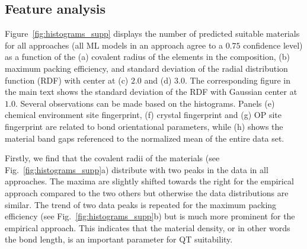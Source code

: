 \documentclass[superscriptaddress,unsortedaddress,
 amsmath,amssymb,
 aps,
]{revtex4-2}
\begin{document}
\subsection*{Feature analysis}
Figure~\ref{fig:histograms_supp} displays the number of predicted suitable materials for all approaches (all ML models in an approach agree to a $0.75$ confidence level) as a function of the (a) covalent radius of the elements in the composition, (b) maximum packing efficiency, and standard deviation of the radial distribution function (RDF) with center at (c) $2.0$ and (d) $3.0$. The corresponding figure in the main text shows the standard deviation of the RDF with Gaussian center at $1.0$. Several observations can be made based on the histograms. Panels (e) chemical environment site fingerprint, (f) crystal fingerprint and (g) OP site fingerprint are related to bond orientational parameters, while (h) shows the material band gaps referenced to the normalized mean of the entire data set.  

Firstly, we find that the covalent radii of the materials (see Fig.~\ref{fig:histograms_supp}a) distribute with two peaks in the data in all approaches. The maxima are slightly shifted towards the right for the empirical approach compared to the two others but otherwise the data distributions are similar. The trend of two data peaks is repeated for the maximum packing efficiency (see Fig.~\ref{fig:histograms_supp}b) but is much more prominent for the empirical approach. This indicates that the material density, or in other words the bond length, is an important parameter for QT suitability.  
\end{document}
